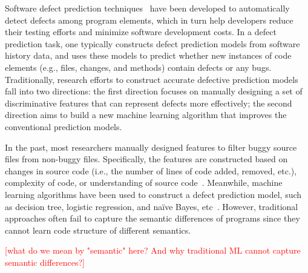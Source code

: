 
Software defect prediction techniques~\cite{hassan2009predicting, jiang2013personalized, zimmermann2007predicting} have been developed to automatically detect defects among program elements, which in turn help developers reduce their testing efforts and minimize
software development costs. In a defect prediction task, one typically constructs
defect prediction models from software history data, and uses these models to predict whether new instances of code elements (e.g., files, changes, and methods) contain defects or any bugs. 
Traditionally, research efforts to construct accurate defective prediction models fall into two directions:
the first direction focuses on manually designing a set of discriminative features that can represent defects more effectively; the second direction aims to build a new machine learning algorithm that improves the conventional prediction models. 

In the past, most researchers manually designed features to filter buggy source files from non-buggy files. Specifically, the features are constructed based on changes in source code (i.e., the number of lines of code added, removed, etc.), complexity of code, or understanding of source code~\cite{jiang2013personalized, e1994candidate, mccabe1976complexity, chidamber1994metrics, harrison1998evaluation}. Meanwhile, machine learning algorithms have been used to construct a defect prediction model, such as decision tree, logistic regression, and na\"{i}ve Bayes, etc~\cite{jing2014dictionary}. 
However, traditional approaches often fail to capture the semantic differences of programs since they cannot learn code structure of different semantics. 

\textcolor{red}{[what do we mean by "semantic" here? And why traditional ML cannot capture semantic differences?]} 

